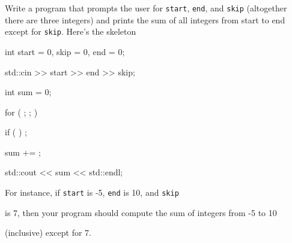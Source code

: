 Write a program that prompts the user for \texttt{start}, \texttt{end}, and \texttt{skip} (altogether there are three integers) and prints the sum of all integers from start to end except for \texttt{skip}. Here's the skeleton

\begin{console}

int start = 0, skip = 0, end = 0;

std::cin >> start >> end >> skip;

int sum = 0;

for (         ;          ;          )

{   

    if (          )          ;

    sum +=          ;

}

std::cout << sum << std::endl;

\end{console}

For instance, if \texttt{start} is -5, \texttt{end} is 10, and \texttt{skip}

is 7, then your program should compute the sum of integers from -5 to 10

(inclusive) except for 7.

